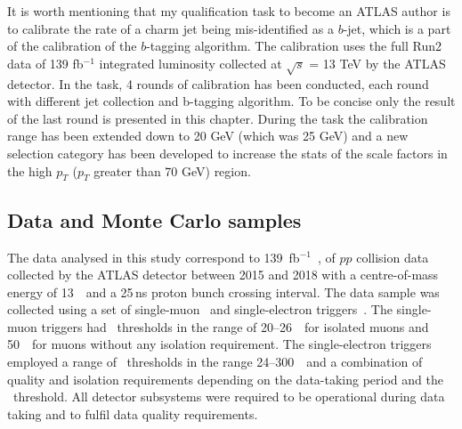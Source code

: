 \documentclass[letterpaper,12pt]{article}
\begin{document}
It is worth mentioning that my qualification task to become an ATLAS author is to 
calibrate the rate of a charm jet being mis-identified as a $b$-jet, which is a part 
of the calibration of the $b$-tagging algorithm. The calibration uses the full Run2 data 
of 139 fb$^{-1}$ integrated luminosity collected at $\sqrt{s}$ = 13 TeV by the ATLAS detector. 
In the task, 4 rounds of calibration has been conducted, each round with different jet collection 
and b-tagging algorithm. To be concise only the result of the last round is presented in this chapter. 
During the task the calibration range has been extended down to 20 GeV (which was 25 GeV) and a new 
selection category has been developed to increase the stats of the scale factors in the 
high $p_T$ ($p_T$ greater than 70 GeV) region.

\subsection{Data and Monte Carlo samples}

\label{sec:samples}
The data analysed in this study correspond to 139~fb$^{-1}$~\cite{DAPR-2010-01,DAPR-2011-01,DAPR-2013-01,LUCID2}, 
of \(pp\) collision data collected by the ATLAS detector between 2015 and 2018
with a centre-of-mass energy of 13~\TeV\ and a 25\,ns proton bunch
crossing interval. 
The data sample was collected using a set of single-muon~\cite{Aad:2020uyd} 
and single-electron triggers~\cite{TRIG-2018-05}. The single-muon triggers 
had \pt\ thresholds in the range of 20--26~\GeV\ for 
isolated muons and 50~\GeV\ for muons without any isolation requirement. 
The single-electron triggers employed a range of \pt\ thresholds in the range 24--300~\GeV\ 
and a combination of quality and isolation requirements depending on the 
data-taking period and the \pt\ threshold.
All detector subsystems were required to be operational
during data taking and to fulfil data quality requirements.  
\end{document}
